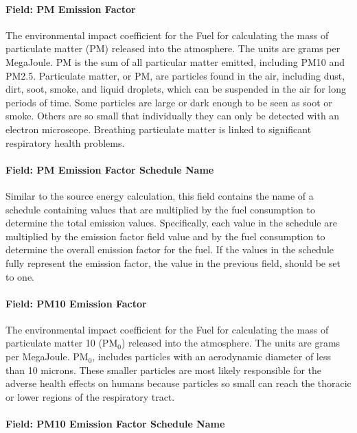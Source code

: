 \paragraph{Field: PM Emission Factor}\label{field-pm-emission-factor}

The environmental impact coefficient for the Fuel for calculating the mass of particulate matter (PM) released into the atmosphere. The units are grams per MegaJoule. PM is the sum of all particular matter emitted, including PM10 and PM2.5. Particulate matter, or PM, are particles found in the air, including dust, dirt, soot, smoke, and liquid droplets, which can be suspended in the air for long periods of time. Some particles are large or dark enough to be seen as soot or smoke. Others are so small that individually they can only be detected with an electron microscope. Breathing particulate matter is linked to significant respiratory health problems.

\paragraph{Field: PM Emission Factor Schedule Name}\label{field-pm-emission-factor-schedule-name}

Similar to the source energy calculation, this field contains the name of a schedule containing values that are multiplied by the fuel consumption to determine the total emission values. Specifically, each value in the schedule are multiplied by the emission factor field value and by the fuel consumption to determine the overall emission factor for the fuel. If the values in the schedule fully represent the emission factor, the value in the previous field, should be set to one.

\paragraph{Field: PM10 Emission Factor}\label{field-pm10-emission-factor}

The environmental impact coefficient for the Fuel for calculating the mass of particulate matter 10 (PM\(_{0}\)) released into the atmosphere. The units are grams per MegaJoule. PM\(_{0}\), includes particles with an aerodynamic diameter of less than 10 microns. These smaller particles are most likely responsible for the adverse health effects on humans because particles so small can reach the thoracic or lower regions of the respiratory tract.

\paragraph{Field: PM10 Emission Factor Schedule Name}\label{field-pm10-emission-factor-schedule-name}


